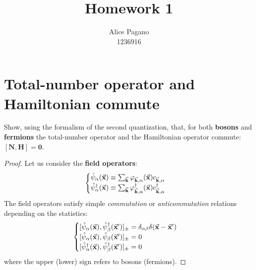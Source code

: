 \documentclass[11pt, a4paper, twoside, openright]{article}
\begin{document}
\title{\textbf{Homework 1}}

\author{Alice Pagano \\ 1236916}

\maketitle

\section{Total-number operator and Hamiltonian commute}

Show, using the formalism of the second quantization, that, for both \textbf{bosons} and \textbf{fermions} the total-number operator and the Hamiltonian operator commute: \( \pmb{[N,H]=0} \).
\begin{proof}
Let us consider the \textbf{field operators}:
\begin{equation}
  \begin{cases}
 \hat{\psi }_ \alpha  (\va{x}) \equiv  \sum_{\va{k}}^{} \varphi _{\va{k}, \alpha } (\va{x}) c_{\va{k}, \alpha }  \\
\hat{\psi }_ \alpha ^\dag   (\va{x}) \equiv  \sum_{\va{k}}^{} \varphi _{\va{k}, \alpha } ^\dag  (\va{x}) c_{\va{k}, \alpha } ^\dag
\end{cases}
\end{equation}
The field operators satisfy simple \emph{commutation} or \emph{anticommutation} relations depending on the statistics:
\begin{equation}
  \begin{cases}
    [\hat{\psi }_ \alpha (\va{x}), \hat{\psi }_ \beta ^\dag (\va{x}')  ]_\pm = \delta _{\alpha \beta } \delta (\va{x}-\va{x}') \\
   [\hat{\psi }_ \alpha (\va{x}), \hat{\psi }_ \beta (\va{x}')  ]_\pm = 0 \\
   [\hat{\psi }_ \alpha ^\dag (\va{x}), \hat{\psi }_ \beta ^\dag (\va{x}')  ]_\pm = 0
  \end{cases}
\end{equation}
where the upper (lower) sign refers to bosons (fermions).


\end{proof}
\end{document}
